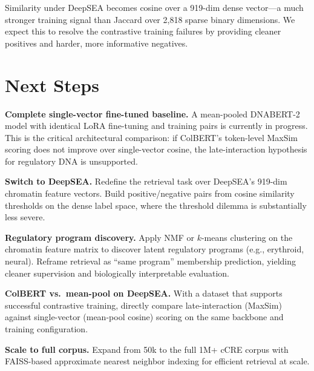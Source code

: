 \documentclass[10pt,twocolumn]{article}
\begin{document}
Similarity under DeepSEA becomes cosine over a 919-dim dense vector---a much stronger training signal than Jaccard over 2,818 sparse binary dimensions. We expect this to resolve the contrastive training failures by providing cleaner positives and harder, more informative negatives.

\section{Next Steps}
\label{sec:next}

\textbf{Complete single-vector fine-tuned baseline.}
A mean-pooled DNABERT-2 model with identical LoRA fine-tuning and training pairs is currently in progress. This is the critical architectural comparison: if ColBERT's token-level MaxSim scoring does not improve over single-vector cosine, the late-interaction hypothesis for regulatory DNA is unsupported.

\textbf{Switch to DeepSEA.}
Redefine the retrieval task over DeepSEA's 919-dim chromatin feature vectors. Build positive/negative pairs from cosine similarity thresholds on the dense label space, where the threshold dilemma is substantially less severe.

\textbf{Regulatory program discovery.}
Apply NMF or $k$-means clustering on the chromatin feature matrix to discover latent regulatory programs (e.g., erythroid, neural). Reframe retrieval as ``same program'' membership prediction, yielding cleaner supervision and biologically interpretable evaluation.

\textbf{ColBERT vs.\ mean-pool on DeepSEA.}
With a dataset that supports successful contrastive training, directly compare late-interaction (MaxSim) against single-vector (mean-pool cosine) scoring on the same backbone and training configuration.

\textbf{Scale to full corpus.}
Expand from 50k to the full 1M+ cCRE corpus with FAISS-based approximate nearest neighbor indexing for efficient retrieval at scale.

\end{document}
